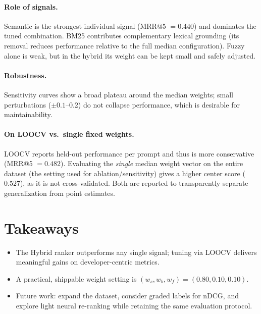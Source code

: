 \paragraph{Role of signals.} Semantic is the strongest individual signal (MRR@5 $=0.440$) and dominates the tuned combination. BM25 contributes complementary lexical grounding (its removal reduces performance relative to the full median configuration). Fuzzy alone is weak, but in the hybrid its weight can be kept small and safely adjusted.

\paragraph{Robustness.} Sensitivity curves show a broad plateau around the median weights; small perturbations ($\pm 0.1$–$0.2$) do not collapse performance, which is desirable for maintainability.

\paragraph{On LOOCV vs.\ single fixed weights.} LOOCV reports held-out performance per prompt and thus is more conservative (MRR@5 $=0.482$). Evaluating the \emph{single} median weight vector on the entire dataset (the setting used for ablation/sensitivity) gives a higher center score ($0.527$), as it is not cross-validated. Both are reported to transparently separate generalization from point estimates.

\section{Takeaways}
\begin{itemize}
  \item The Hybrid ranker outperforms any single signal; tuning via LOOCV delivers meaningful gains on developer-centric metrics.
  \item A practical, shippable weight setting is \textbf{$(w_s,w_b,w_f)=(0.80,0.10,0.10)$}.
  \item Future work: expand the dataset, consider graded labels for nDCG, and explore light neural re-ranking while retaining the same evaluation protocol.
\end{itemize}
